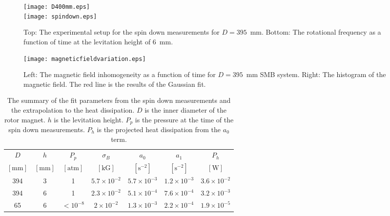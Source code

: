 \documentclass[journal]{IEEEtran}
\begin{document}
\begin{figure}[htb]
   \centering
   \texttt{[image: D400mm.eps]} \\
   \vspace{3mm}
   \texttt{[image: spindown.eps]}
   \caption{Top: The experimental setup for the spin down measurements for $D=395$~mm. Bottom: The rotational frequency as a function of time at the levitation height of 6~mm.}
   \label{fig:spindown}
\end{figure}

\begin{figure}[htb]
   \centering
   \texttt{[image: magneticfieldvariation.eps]} %
   \caption{Left: The magnetic field inhomogeneity as a function of time for $D=395$~mm SMB system. Right: The histogram of the magnetic field. The red line is the results of the Gaussian fit. }
   \label{fig:Bval}
\end{figure}


\begin{table*}[t]
   \centering
   \begin{tabular}{c|c|c|c|c|c|c} %
	    $D$ & $h$& $P_p$ & $\sigma_B$ &$a_0$ & $a_1$  & $P_h$\\
	     $[\mbox{mm}]$ & $[\mbox{mm}]$ & $[\mbox{atm}]$ & $[\mbox{kG}]$ & $[\mbox{s}^{-2}]$  & $[\mbox{s}^{-2}]$  & $[\mbox{W}]$ \\ \hline
        394 & 3  & 1  & $5.7\times10^{-2}$ & $5.7\times10^{-3}$  & $1.2\times10^{-3}$ & $3.6\times10^{-2}$\\
	394 & 6  &  1 & $2.3\times10^{-2}$ & $5.1\times10^{-4}$ & $7.6\times10^{-4}$ & $3.2\times10^{-3}$\\
	65 & 6   &  $<10^{-8}$ & $2\times10^{-2}$ & $1.3\times10^{-3}$ & $2.2\times10^{-4}$ & $1.9\times10^{-5}$
   \end{tabular}
   \caption{The summary of the fit parameters from the spin down measurements and the extrapolation to the heat dissipation.
     $D$ is the inner diameter of the rotor magnet.
     $h$ is the levitation height.
     $P_p$ is the pressure at the time of the spin down measurements.
     $P_h$ is the projected heat dissipation from the $a_0$ term.}

   \label{tab:fitpar}
\end{table*}
\end{document}
